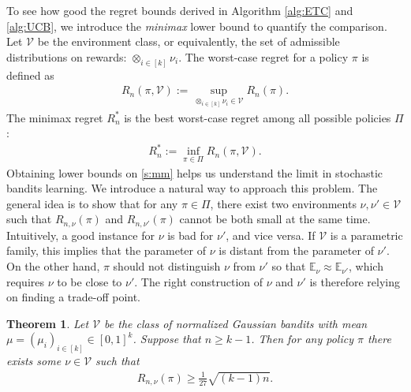 \documentclass[10pt,a4article]{amsart}
\numberwithin{equation}{section}
\theoremstyle{plain}
\newtheorem{Th}{Theorem}
\theoremstyle{definition}
\def\E{{\mathbb E}}
\def\V{{\mathcal V}}
\begin{document}
To see how good the regret bounds derived in Algorithm \ref{alg:ETC} and \ref{alg:UCB}, we introduce the \emph{minimax} lower bound to quantify the comparison. Let $\V$ be the environment class, or equivalently, the set of admissible distributions on rewards: $\otimes_{i\in [k]}\nu_i$. The worst-case regret for a policy $\pi$ is defined as 
\begin{align*}
R_n(\pi, \V):=\sup_{\otimes_{i\in [k]}\nu_i\in\V}R_n(\pi).
\end{align*}
The minimax regret $R_n^*$ is the best worst-case regret among all possible policies $\Pi$: 
\begin{align}
R_n^*:=\inf_{\pi\in\Pi}R_n(\pi, \V).\label{s:mm}
\end{align}
Obtaining lower bounds on \eqref{s:mm} helps us understand the limit in stochastic bandits learning. We introduce a natural way to approach this problem.  The general idea is to show that for any $\pi\in\Pi$, there exist two environments $\nu, \nu'\in\V$ such that $R_{n,\nu}(\pi)$ and $R_{n,\nu'}(\pi)$ cannot be both small at the same time. Intuitively, a good instance for $\nu$ is bad for $\nu'$, and vice versa. If $\V$ is a parametric family, this implies that the parameter of $\nu$ is distant from the parameter of $\nu'$. On the other hand, $\pi$ should not distinguish $\nu$ from $\nu'$ so that $\E_\nu\approx\E_{\nu'}$, which requires $\nu$ to be close to $\nu'$. The right construction of $\nu$ and $\nu'$ is therefore relying on finding a trade-off point.  
\begin{Th}\label{s:minimax}
Let $\V$ be the class of normalized Gaussian bandits with mean $\mu=(\mu_i)_{i\in [k]}\in [0,1]^k$. Suppose that $n\geq k-1$. Then for any policy $\pi$ there exists some $\nu\in\V$ such that
\begin{align}
R_{n,\nu}(\pi)\geq\frac{1}{27}\sqrt{(k-1)n}. \label{s:6}
\end{align}  
\end{Th}
\end{document}
